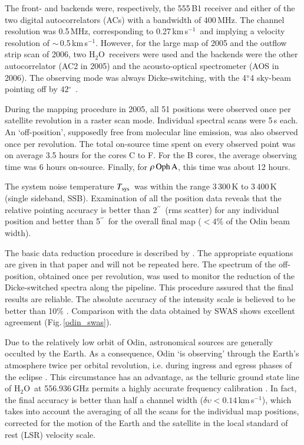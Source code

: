 \documentclass{aa}
\newcommand{\kms}{km\,s$^{-1}$}       %
\newcommand{\tsys}{$T_{\rm sys}$}
\newcommand{\water}{H$_{2}$O}
\newcommand{\about}{$\sim$}                       %
\newcommand{\roa}{$\rho \, {\rm Oph \, A}$}
\newcommand{\asec}{$^{\prime \prime}$}
\newcommand{\adeg}{$^{\circ}$}
\newcommand{\adegdot}[2]{\mbox{#1$\stackrel {\circ}{_{\bf \cdot}}$#2}}
\begin{document}
The front- and backends \citep{frisk2003,olberg2003} were, respectively, the 555\,B1 receiver and either of the two digital autocorrelators (ACs) with a bandwidth of 400\,MHz. The channel resolution was 0.5\,MHz, corresponding to 0.27\,\kms\ and implying a velocity resolution of \about\,0.5\,\kms. However, for the large map of 2005 and  the outflow strip scan of 2006, two \water\ receivers were used and the backends were the other autocorrelator (AC2 in 2005) and the acousto-optical spectrometer (AOS in 2006). The observing mode was always Dicke-switching, with the \adegdot{4}{4} sky-beam pointing off by $42$\adeg\ \citep{olberg2003}.

During the mapping procedure in 2005, all 51 positions were observed once per satellite revolution in a raster scan mode. Individual spectral scans were 5\,s each. An `off-position', supposedly free from molecular line emission, was also observed once per revolution. The total on-source time spent on every observed point was on  average 3.5 hours for the cores C to F. For the B cores, the average observing time was 6 hours on-source. Finally, for \roa, this time was about 12 hours. 

The system noise temperature \tsys\  was within the range 3\,300\,K to 3\,400\,K (single sideband, SSB). Examination of all the position data reveals that the relative pointing accuracy
is better than 2\asec\ (rms scatter) for any individual position and better than 5\asec\ for the overall final map ($<4\%$ of the Odin beam width).

The basic data reduction procedure is described by \cite{olberg2003}. The appropriate equations are given in that paper and will not be repeated here. The spectrum of the off-position, obtained once per revolution, was used to monitor the reduction of the Dicke-switched spectra along the pipeline. This procedure assured that the final results are reliable. The absolute accuracy of the intensity scale is believed to be better than 10\% \citep{hjalmarson2003}. Comparison with the data obtained by SWAS shows excellent agreement (Fig.\,\ref{odin_swas}).

Due to the relatively low orbit of Odin, astronomical sources are generally occulted by the Earth. As a consequence, Odin `is observing' through the Earth's atmosphere twice per orbital revolution, i.e. during ingress  and egress phases of the eclipse \citep[see Fig.\,2 in][]{nordh2003}. This circumstance has  an advantage, as the telluric ground state line of \water\ at 556.936\,GHz permits a highly accurate frequency calibration \citep{larsson2003}. In fact, the final accuracy is better than half a channel width ($\delta \upsilon < 0.14$\,\kms), which takes into account the {averaging of all} the scans for the individual map positions, corrected for the motion of the Earth and the satellite in the local standard of rest (LSR) velocity scale.
\end{document}
